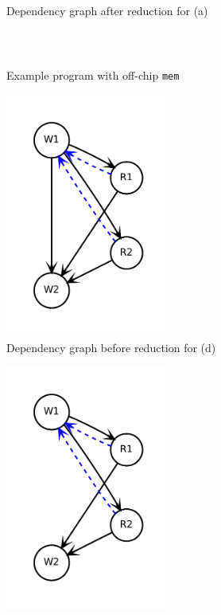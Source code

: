 \begin{figure}
\begin{subfigure}[b]{0.3\textwidth}
\caption{
  Dependency graph after reduction for (a)
}
\end{subfigure}
\\
\begin{subfigure}[b]{0.34\textwidth}
\inputminted{python}{code/graphred2.py}
\caption{
  Example program with off-chip \texttt{mem}
}
\end{subfigure}
\begin{subfigure}[b]{0.3\textwidth}
  \centering
\includegraphics[width=0.6\textwidth]{figs/graphred2.pdf}
\caption{
  Dependency graph before reduction for (d)
}
\end{subfigure}
\begin{subfigure}[b]{0.3\textwidth}
  \centering
\includegraphics[width=0.6\textwidth]{figs/graphred2_after.pdf}

\end{subfigure}
\end{figure}
